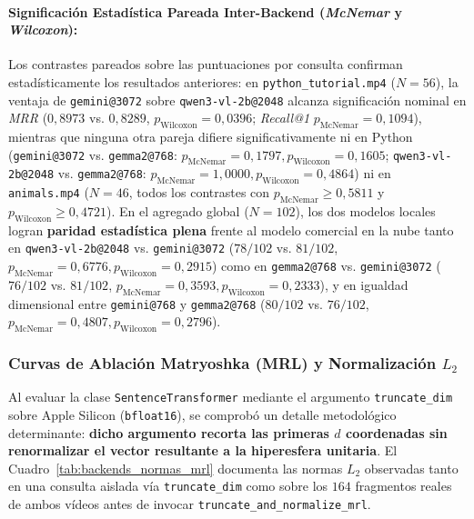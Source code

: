 \paragraph{Significación Estadística Pareada Inter-Backend (\textit{McNemar} y \textit{Wilcoxon}):}
Los contrastes pareados sobre las puntuaciones por consulta confirman estadísticamente los resultados anteriores: en \texttt{python\_tutorial.mp4} ($N=56$), la ventaja de \texttt{gemini@3072} sobre \texttt{qwen3-vl-2b@2048} alcanza significación nominal en \textit{MRR} ($0,8973$ vs. $0,8289$, $p_{\text{Wilcoxon}} = 0,0396$; \textit{Recall@1} $p_{\text{McNemar}} = 0,1094$), mientras que ninguna otra pareja difiere significativamente ni en Python (\texttt{gemini@3072} vs. \texttt{gemma2@768}: $p_{\text{McNemar}} = 0,1797, p_{\text{Wilcoxon}} = 0,1605$; \texttt{qwen3-vl-2b@2048} vs. \texttt{gemma2@768}: $p_{\text{McNemar}} = 1,0000, p_{\text{Wilcoxon}} = 0,4864$) ni en \texttt{animals.mp4} ($N=46$, todos los contrastes con $p_{\text{McNemar}} \ge 0,5811$ y $p_{\text{Wilcoxon}} \ge 0,4721$). En el agregado global ($N=102$), los dos modelos locales logran \textbf{paridad estadística plena} frente al modelo comercial en la nube tanto en \texttt{qwen3-vl-2b@2048} vs. \texttt{gemini@3072} ($78/102$ vs. $81/102$, $p_{\text{McNemar}} = 0,6776, p_{\text{Wilcoxon}} = 0,2915$) como en \texttt{gemma2@768} vs. \texttt{gemini@3072} ($76/102$ vs. $81/102$, $p_{\text{McNemar}} = 0,3593, p_{\text{Wilcoxon}} = 0,2333$), y en igualdad dimensional entre \texttt{gemini@768} y \texttt{gemma2@768} ($80/102$ vs. $76/102$, $p_{\text{McNemar}} = 0,4807, p_{\text{Wilcoxon}} = 0,2796$).

\subsubsection{Curvas de Ablación Matryoshka (MRL) y Normalización \texorpdfstring{$L_2$}{L2}}
\label{subsubsec:curvas_mrl_normas}

Al evaluar la clase \texttt{Sentence\allowbreak Transformer} mediante el argumento \texttt{truncate\_\allowbreak dim} sobre Apple Silicon (\texttt{bfloat16}), se comprobó un detalle metodológico determinante: \textbf{dicho argumento recorta las primeras $d$ coordenadas sin renormalizar el vector resultante a la hiperesfera unitaria}. El Cuadro~\ref{tab:backends_normas_mrl} documenta las normas $L_2$ observadas tanto en una consulta aislada vía \texttt{truncate\_\allowbreak dim} como sobre los $164$ fragmentos reales de ambos vídeos antes de invocar \texttt{truncate\_\allowbreak and\_\allowbreak normalize\_\allowbreak mrl}.

